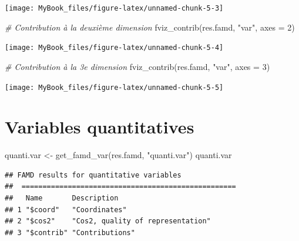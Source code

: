 \documentclass[
  12pt,
  american,
  a4paper,
  extrafontsizes,onecolumn,openright
  ]{memoir}
\newenvironment{Shaded}{\begin{snugshade}}{\end{snugshade}}
\newcommand{\AttributeTok}[1]{\textcolor[rgb]{0.77,0.63,0.00}{#1}}
\newcommand{\CommentTok}[1]{\textcolor[rgb]{0.56,0.35,0.01}{\textit{#1}}}
\newcommand{\DecValTok}[1]{\textcolor[rgb]{0.00,0.00,0.81}{#1}}
\newcommand{\FunctionTok}[1]{\textcolor[rgb]{0.00,0.00,0.00}{#1}}
\newcommand{\NormalTok}[1]{#1}
\newcommand{\OtherTok}[1]{\textcolor[rgb]{0.56,0.35,0.01}{#1}}
\newcommand{\StringTok}[1]{\textcolor[rgb]{0.31,0.60,0.02}{#1}}
\begin{document}
\begin{center}\texttt{[image: MyBook\_files/figure-latex/unnamed-chunk-5-3]} \end{center}

\begin{Shaded}
\begin{Highlighting}[]
\CommentTok{\# Contribution à la deuxième dimension}
\FunctionTok{fviz\_contrib}\NormalTok{(res.famd, }\StringTok{"var"}\NormalTok{, }\AttributeTok{axes =} \DecValTok{2}\NormalTok{)}
\end{Highlighting}
\end{Shaded}

\begin{center}\texttt{[image: MyBook\_files/figure-latex/unnamed-chunk-5-4]} \end{center}

\begin{Shaded}
\begin{Highlighting}[]
\CommentTok{\# Contribution à la 3e dimension}
\FunctionTok{fviz\_contrib}\NormalTok{(res.famd, }\StringTok{"var"}\NormalTok{, }\AttributeTok{axes =} \DecValTok{3}\NormalTok{)}
\end{Highlighting}
\end{Shaded}

\begin{center}\texttt{[image: MyBook\_files/figure-latex/unnamed-chunk-5-5]} \end{center}

\normalsize

\hypertarget{variables-quantitatives}{%
\section{Variables quantitatives}\label{variables-quantitatives}}

\scriptsize

\begin{Shaded}
\begin{Highlighting}[]
\NormalTok{quanti.var }\OtherTok{\textless{}{-}} \FunctionTok{get\_famd\_var}\NormalTok{(res.famd, }\StringTok{"quanti.var"}\NormalTok{)}
\NormalTok{quanti.var}
\end{Highlighting}
\end{Shaded}

\begin{verbatim}
## FAMD results for quantitative variables 
##  ===================================================
##   Name       Description                      
## 1 "$coord"   "Coordinates"                    
## 2 "$cos2"    "Cos2, quality of representation"
## 3 "$contrib" "Contributions"
\end{verbatim}
\end{document}
